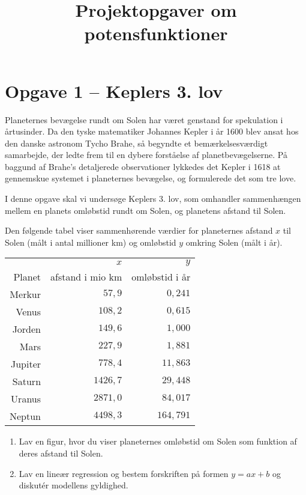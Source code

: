 \documentclass[12pt,oneside,a4paper]{article}
\title{Projektopgaver om potensfunktioner}
\date{\vspace{-5ex}}
\theoremstyle{plain}
\begin{document}
\maketitle

\section*{Opgave 1 -- Keplers 3. lov}
Planeternes bevægelse rundt om Solen har været genstand for spekulation i
årtusinder.  Da den tyske matematiker Johannes Kepler i år 1600 blev ansat hos
den danske astronom Tycho Brahe, så begyndte et bemærkelsesværdigt samarbejde,
der ledte frem til en dybere forståelse af planetbevægelserne. På baggund af
Brahe's detaljerede observationer lykkedes det Kepler i 1618 at gennemskue
systemet i planeternes bevægelse, og formulerede det som tre love.

I denne opgave skal vi undersøge Keplers 3. lov, som omhandler sammenhængen
mellem en planets omløbstid rundt om Solen, og planetens afstand til Solen.

Den følgende tabel viser sammenhørende værdier for planeternes afstand $x$ til
Solen (målt i antal millioner km) og omløbstid $y$ omkring Solen (målt i år).

\vspace{2ex}

\begin{center}
\begin{tabular}{r|r|r}
    \hline
            & $x$                 & $y$ \\
    Planet  & afstand i mio km    & omløbstid i år   \\
    \hline 
    Merkur  &  $  57,9$ &   $0,241$ \\
    Venus   &  $ 108,2$ &   $0,615$ \\
    Jorden  &  $ 149,6$ &   $1,000$ \\
    Mars    &  $ 227,9$ &   $1,881$ \\
    Jupiter &  $ 778,4$ &  $11,863$ \\
    Saturn  &  $1426,7$ &  $29,448$ \\
    Uranus  &  $2871,0$ &  $84,017$ \\
    Neptun  &  $4498,3$ & $164,791$ \\
    \hline 
\end{tabular}
\end{center}

\begin{enumerate}[label=(\alph*)]
    \item Lav en figur, hvor du viser planeternes omløbstid om Solen som
        funktion af deres afstand til Solen.
    \item Lav en lineær regression og bestem forskriften på formen $y=ax+b$ og
        diskutér modellens gyldighed.
\end{enumerate}
\end{document}
